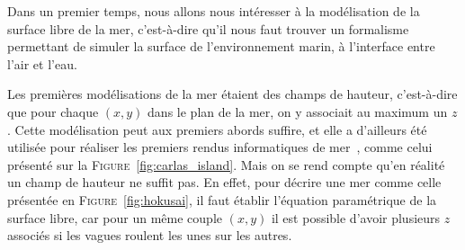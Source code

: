 				Dans un premier temps, nous allons nous intéresser à la modélisation de la surface libre de la mer, c’est-à-dire qu'il nous faut trouver un formalisme permettant de simuler la surface de l'environnement marin, à l'interface entre l'air et l'eau.

				Les premières modélisations de la mer étaient des champs de hauteur, c’est-à-dire que pour chaque $(x, y)$ dans le plan de la mer, on y associait au maximum un $z$. Cette modélisation peut aux premiers abords suffire, et elle a d'ailleurs été utilisée pour réaliser les premiers rendus informatiques de mer~\cite{scha80, max81}, comme celui présenté sur la \textsc{Figure}~\ref{fig:carlas_island}. Mais on se rend compte qu'en réalité un champ de hauteur ne suffit pas. En effet, pour décrire une mer comme celle présentée en \textsc{Figure}~\ref{fig:hokusai}, il faut établir l'équation paramétrique de la surface libre, car pour un même couple $(x, y)$ il est possible d'avoir plusieurs $z$ associés si les vagues roulent les unes sur les autres.

